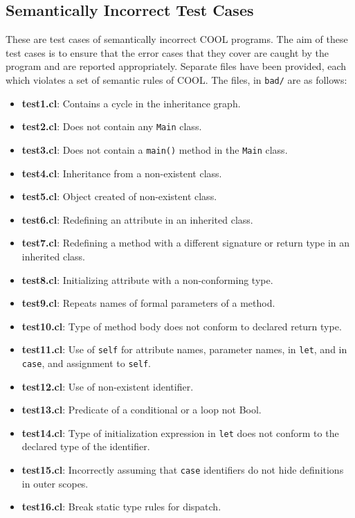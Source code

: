 \documentclass{article}
\begin{document}
\subsection{Semantically Incorrect Test Cases}
These are test cases of semantically incorrect COOL programs. The aim of these test cases is to ensure that the error cases that they cover are caught by the program and are reported appropriately. Separate files have been provided, each which violates a set of semantic rules of COOL. The files, in \verb|bad/| are as follows:
\begin{itemize}
	\item \textbf{test1.cl}: Contains a cycle in the inheritance graph.
	\item \textbf{test2.cl}: Does not contain any \verb|Main| class.
	\item \textbf{test3.cl}: Does not contain a \verb|main()| method in the \verb|Main| class.
	\item \textbf{test4.cl}: Inheritance from a non-existent class.
	\item \textbf{test5.cl}: Object created of non-existent class.
	\item \textbf{test6.cl}: Redefining an attribute in an inherited class.
	\item \textbf{test7.cl}: Redefining a method with a different signature or return type in an inherited class.
	\item \textbf{test8.cl}: Initializing attribute with a non-conforming type.
	\item \textbf{test9.cl}: Repeats names of formal parameters of a method.
	\item \textbf{test10.cl}: Type of method body does not conform to declared return type.
	\item \textbf{test11.cl}: Use of \verb|self| for attribute names, parameter names, in \verb|let|, and in \verb|case|, and assignment to \verb|self|.
	\item \textbf{test12.cl}: Use of non-existent identifier.
	\item \textbf{test13.cl}: Predicate of a conditional or a loop not Bool.
	\item \textbf{test14.cl}: Type of initialization expression in \verb|let| does not conform to the declared type of the identifier.
	\item \textbf{test15.cl}: Incorrectly assuming that \verb|case| identifiers do not hide definitions in outer scopes.
	\item \textbf{test16.cl}: Break static type rules for dispatch.

\end{itemize}
\end{document}
